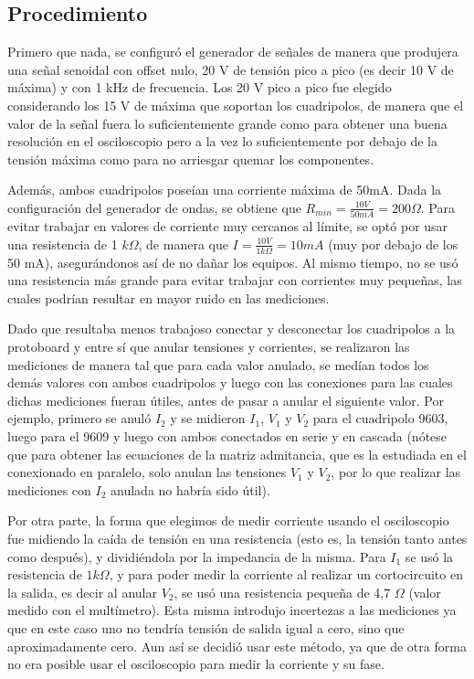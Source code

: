 \graphicspath{{imagenesFiguras/}} %

    \subsection{Procedimiento}
    
    Primero que nada, se configuró el generador de señales de manera que produjera una señal senoidal con offset nulo, 20 V de tensión
    pico a pico (es decir 10 V de máxima) y con 1 kHz de frecuencia. Los 20 V pico a pico fue elegido considerando los 15 V de máxima
    que soportan los cuadripolos, de manera que el valor de la señal fuera lo suficientemente grande como para obtener una buena 
    resolución en el osciloscopio pero a la vez lo suficientemente por debajo de la tensión máxima como para no arriesgar quemar los
    componentes. 
    
    
    Además, ambos cuadripolos poseían una corriente máxima de 50mA. Dada la configuración del generador de ondas, se obtiene que  
    $R_{min} = \frac{10 V}{50 mA} = 200 \Omega$. Para evitar trabajar en valores de corriente muy cercanos al límite, se optó por
    usar una resistencia de 1 $k\Omega$, de manera que $ I = \frac{10 V}{1 k\Omega} = 10 mA $ (muy por debajo de los 50 mA), 
    asegurándonos así de no dañar los equipos. Al mismo tiempo, no se usó una resistencia más grande para evitar trabajar con
    corrientes muy pequeñas, las cuales podrían resultar en mayor ruido en las mediciones. 

    \par Dado que resultaba menos trabajoso conectar y desconectar los cuadripolos a la protoboard y entre sí que anular tensiones y
    corrientes, se realizaron las mediciones de manera tal que para cada valor anulado, se medían todos los demás valores con ambos
    cuadripolos y luego con las conexiones para las cuales dichas mediciones fueran útiles, antes de pasar a anular el siguiente valor.
    Por ejemplo, primero se anuló $ I_2 $ y se midieron $ I_1 $, $ V_1 $ y $ V_2 $ para el cuadripolo 9603, luego 
    para el 9609 y luego con ambos conectados en serie y en cascada (nótese que para obtener las ecuaciones de la matriz admitancia, 
    que es la estudiada en el conexionado en paralelo, solo anulan las tensiones $ V_1 $ y $ V_2 $, por lo que realizar las mediciones
    con $ I_2 $ anulada no habría sido útil).

    \par Por otra parte, la forma que elegimos de medir corriente usando el osciloscopio fue midiendo la caída de tensión en una 
    resistencia (esto es, la tensión tanto antes como después), y dividiéndola por la impedancia de la misma. Para $ I_1 $ se usó la
    resistencia de $ 1 k\Omega $, y para poder medir la corriente al realizar un cortocircuito en la salida, es decir al anular $ V_2 $,
    se usó una resistencia pequeña de 4,7 $\Omega$ (valor medido con el multímetro). Esta misma introdujo incertezas a las mediciones
    ya que en este caso uno no tendría tensión de salida igual a cero, sino que aproximadamente cero. Aun así se decidió usar este
    método, ya que de otra forma no era posible usar el osciloscopio para medir la corriente y su fase.


